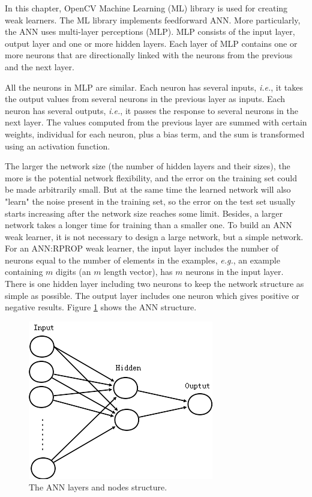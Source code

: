 In this chapter, OpenCV Machine Learning (ML) library is used for creating weak learners. The ML library implements feedforward ANN. More particularly, the ANN uses multi-layer perceptions (MLP). MLP consists of the input layer, output layer and one or more hidden layers. Each layer of MLP contains one or more neurons that are directionally linked with the neurons from the previous and the next layer.

All the neurons in MLP are similar. Each neuron has several inputs, \textit{i.e.}, it takes the output values from several neurons in the previous layer as inputs. Each neuron has several outputs, \textit{i.e.}, it passes the response to several neurons in the next layer. The values computed from the previous layer are summed with certain weights, individual for each neuron, plus a bias term, and the sum is transformed using an activation function.

The larger the network size (the number of hidden layers and their sizes), the more is the potential network flexibility, and the error on the training set could be made arbitrarily small. But at the same time the learned network will also "learn" the noise present in the training set, so the error on the test set usually starts increasing after the network size reaches some limit. Besides, a larger network takes a longer time for training than a smaller one. To build an ANN weak learner, it is not necessary to design a large network, but a simple network. For an ANN:RPROP weak learner, the input layer includes the number of neurons equal to the number of elements in the examples, \textit{e.g.}, an example containing $m$ digits (an $m$ length vector), has $m$ neurons in the input layer. There is one hidden layer including two neurons to keep the network structure as simple as possible. The output layer includes one neuron which gives positive or negative results. \mbox{Figure} \ref{fig:annstructure} shows the ANN structure.
\begin{figure}[ht]
\begin{center}
  \includegraphics{ch4/figures/annstructure.png}
\caption{The ANN layers and nodes structure.}
\label{fig:annstructure}
\end{center}
\end{figure}

